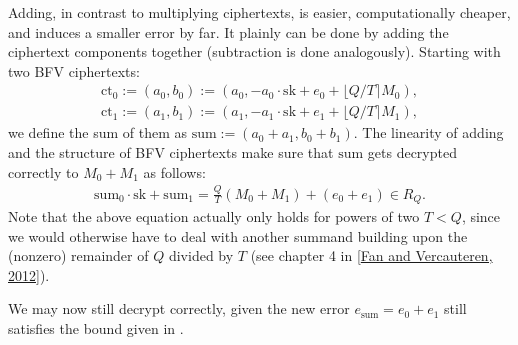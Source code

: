 \documentclass[letterpaper,10pt,english]{jupyterBook}
\begin{document}
\sphinxAtStartPar
Adding, in contrast to multiplying ciphertexts, is easier, computationally cheaper, and induces a smaller error by far.
It plainly can be done by adding the ciphertext components together (subtraction is done analogously).
Starting with two BFV ciphertexts:
\begin{equation*}
\begin{split}\mathrm{ct}_0 := (a_0,b_0) := (a_0, -a_0\cdot \mathrm{sk} + e_0 + \lfloor Q/T\rceil M_0),\\
\mathrm{ct}_1 := (a_1,b_1) := (a_1, -a_1\cdot \mathrm{sk} + e_1 + \lfloor Q/T\rceil M_1),\end{split}
\end{equation*}
\sphinxAtStartPar
we define the sum of them as \(\mathrm{sum} := (a_0+a_1,b_0+b_1)\).
The linearity of adding and the structure of BFV ciphertexts make sure that \(\mathrm{sum}\) gets decrypted correctly to \(M_0+M_1\) as follows:
\begin{equation*}
\begin{split}\mathrm{sum}_0 \cdot \mathrm{sk} + \mathrm{sum}_1 = \frac{Q}{T}(M_0+M_1) + (e_0 + e_1) \in R_Q.\end{split}
\end{equation*}
\sphinxAtStartPar
Note that the above equation actually only holds for powers of two \(T < Q\), since we would otherwise have to deal with another summand building upon the (nonzero) remainder of \(Q\) divided by \(T\) (see chapter 4 in {[}\hyperlink{cite.Thesis:id70}{Fan and Vercauteren, 2012}{]}).

\sphinxAtStartPar
We may now still decrypt correctly, given the new error \(e_{\mathrm{sum}} = e_0+e_1\) still satisfies the bound given in {\hyperref[\detokenize{Thesis:correct-BFV-decryption}]{}}.
\end{document}
